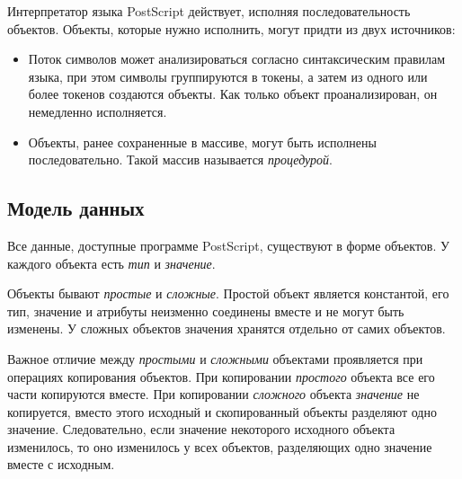  
Интерпретатор  языка PostScript действует, исполняя последовательность объектов. Объекты, которые нужно исполнить, могут придти из двух источников:
\begin{itemize}
\item Поток символов может анализироваться согласно синтаксическим правилам языка, при этом символы группируются в токены, а затем из одного или более токенов создаются объекты. Как только объект проанализирован, он немедленно исполняется. 
\item Объекты, ранее сохраненные в массиве, могут быть исполнены последовательно. Такой массив называется \textit{процедурой}.
\end{itemize} 
 
\subsection{Модель данных}
Все данные, доступные программе PostScript, существуют в форме объектов. У каждого объекта есть \textit{тип} и \textit{значение}. %

Объекты бывают \textit{простые} и \textit{сложные}. Простой объект является константой, его тип, значение и атрибуты неизменно соединены вместе и не могут быть изменены. У сложных объектов значения хранятся отдельно от самих объектов. 

Важное отличие между \textit{простыми} и \textit{сложными} объектами проявляется при операциях копирования объектов. При копировании \textit{простого} объекта все его части копируются вместе. При копировании \textit{сложного} объекта \textit{значение} не копируется, вместо этого исходный и скопированный объекты разделяют одно значение.
Следовательно, если значение некоторого исходного объекта изменилось, то оно изменилось у всех объектов, разделяющих одно значение вместе с исходным.



